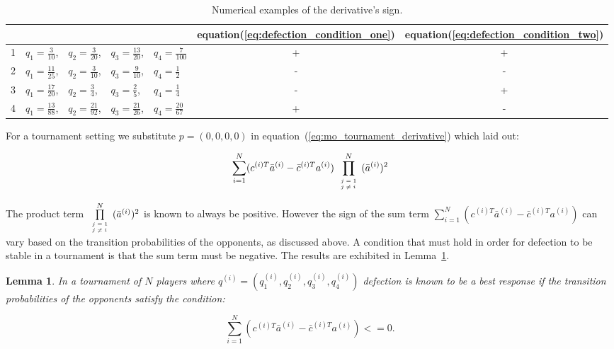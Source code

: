 \documentclass[10pt]{article}
\newtheorem{lemma}[theorem]{Lemma}
\begin{document}
\begin{table}[htbp]
\begin{center}
\begin{tabular}{cllllcc}
    \toprule
    {}& {} & {}& {}& {}&  equation(\ref{eq:defection_condition_one}) &  equation(\ref{eq:defection_condition_two}) \\
    \midrule
1 & \(q_1=\frac{3}{10}\),   & \(q_2=\frac{3}{20}\),  & \(q_3=\frac{13}{20}\), & \(q_4=\frac{7}{100}\)
&  + & + \\
2 & \(q_1=\frac{11}{25}\),  & \(q_2=\frac{3}{10}\),  & \(q_3=\frac{9}{10}\),  & \(q_4=\frac{1}{2}\)
&  - & - \\
3 & \(q_1=\frac{17}{20}\),  & \(q_2=\frac{3}{4}\),   & \(q_3=\frac{2}{5}\),   & \(q_4=\frac{1}{4}\)
&  - & + \\
4 & \(q_1=\frac{13}{88}\),  & \(q_2=\frac{21}{92}\),  & \(q_3=\frac{21}{26}\),  & \(q_4=\frac{20}{67}\)
&  + & - \\
    \bottomrule
\end{tabular}
\end{center}
\caption{Numerical examples of the derivative's sign.}
\label{table:sign_of_derivative}
\end{table}

For a tournament setting we substitute \(p = (0, 0, 0, 0)\) in
equation~(\ref{eq:mo_tournament_derivative}) which laid out:

\begin{equation}
\sum_{i=1} ^ N (c^{(i)T} \bar{a}^{(i)} - \bar{c}^{(i)T} a^{(i)})
\prod\limits_{\tiny\begin{array}{l} j=1 \\ j \neq i \end{array}} ^ N (\bar{a}^{(i)})^2
\end{equation}

The product term \(\prod\limits_{\tiny\begin{array}{l} j=1 \\ j \neq i \end{array}} ^ N (\bar{a}^{(i)})^2\)
is known to always be positive. However the sign of the sum term 
\(\sum_{i=1} ^ N (c^{(i)T} \bar{a}^{(i)} - \bar{c}^{(i)T} a^{(i)})\) can vary based
on the transition probabilities of the opponents, as discussed above. A condition that
must hold in order for defection to be stable in a tournament is that the sum term
must be negative. The results are exhibited in Lemma~\ref{lemma:stability_of_defection}.

\begin{lemma}\label{lemma:stability_of_defection}
    In a tournament of \(N\) players where \(q^{(i)} = (q_{1}^{(i)}, q_{2}^{(i)}, q_{3}^{(i)}, q_{4}^{(i)})\)
    defection is known to be a best response if the transition probabilities of the
    opponents satisfy the condition:

    \begin{equation}
        \sum_{i=1} ^ N (c^{(i)T} \bar{a}^{(i)} - \bar{c}^{(i)T} a^{(i)}) <= 0.
    \end{equation}
\end{lemma}
\end{document}
